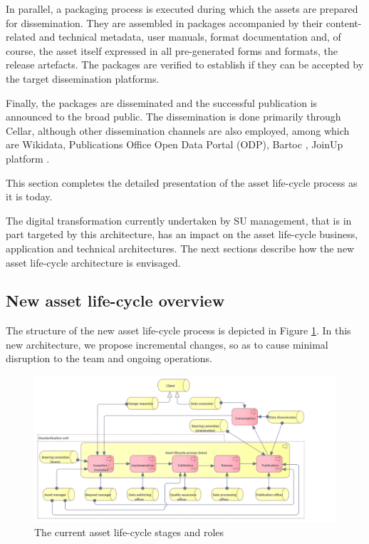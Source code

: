 	In parallel, a packaging process is executed during which the assets are prepared for dissemination. They are assembled in packages accompanied by their content-related and technical metadata, user manuals, format documentation and, of course, the asset itself expressed in all pre-generated forms and formats, the release artefacts. The packages are verified to establish if they can be accepted by the target dissemination platforms.
	
	Finally, the packages are disseminated and the successful publication is announced to the broad public. The dissemination is done primarily through Cellar\citep{cdm-francesconi2015ontology}, although other dissemination channels are also employed, among which are Wikidata\citep{vrandevcic2014wikidata}, Publications Office Open Data Portal (ODP), Bartoc \citep{ledl2016describing}, JoinUp platform \citep{hillenius2013free}.
	
	This section completes the detailed presentation of the asset life-cycle process as it is today. 
	
	The digital transformation currently undertaken by SU management, that is in part targeted by this architecture, has an impact on the asset life-cycle business, application and technical architectures. The next sections describe how the new asset life-cycle architecture is envisaged. 
		
	\subsection{New asset life-cycle overview}
	\label{sec:lifecycle-new}	
	
	The structure of the new asset life-cycle process is depicted in Figure \ref{fig:lifecycle-new}. In this new architecture, we propose incremental changes, so as to cause minimal disruption to the team and ongoing operations. 

	\begin{figure}[h]
		\centering
		\includegraphics[width=1.05\textwidth]{images/business/Lifecycle (new).png}
		\caption{The current asset life-cycle stages and roles}
		\label{fig:lifecycle-new}
	\end{figure}
	
